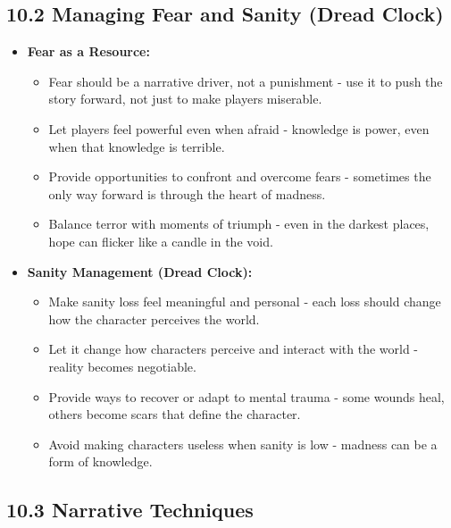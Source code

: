 \documentclass[11pt]{article}
\begin{document}
\subsection*{10.2 Managing Fear and Sanity (Dread Clock)}

\begin{itemize}
\item \textbf{Fear as a Resource:}
\begin{itemize}
\item Fear should be a narrative driver, not a punishment - use it to push the story forward, not just to make players miserable.
\item Let players feel powerful even when afraid - knowledge is power, even when that knowledge is terrible.
\item Provide opportunities to confront and overcome fears - sometimes the only way forward is through the heart of madness.
\item Balance terror with moments of triumph - even in the darkest places, hope can flicker like a candle in the void.
\end{itemize}
\item \textbf{Sanity Management (Dread Clock):}
\begin{itemize}
\item Make sanity loss feel meaningful and personal - each loss should change how the character perceives the world.
\item Let it change how characters perceive and interact with the world - reality becomes negotiable.
\item Provide ways to recover or adapt to mental trauma - some wounds heal, others become scars that define the character.
\item Avoid making characters useless when sanity is low - madness can be a form of knowledge.
\end{itemize}
\end{itemize}

\clearpage

\subsection*{10.3 Narrative Techniques}
\end{document}
